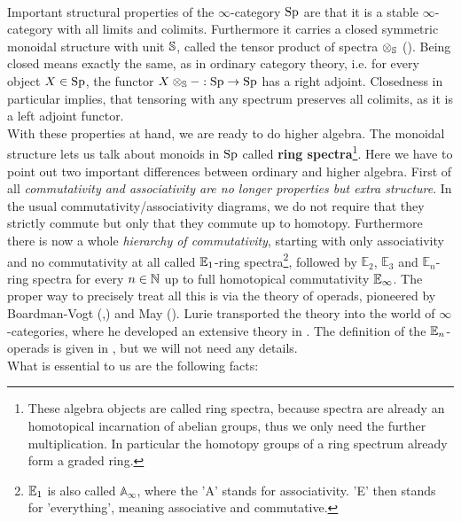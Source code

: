 \\
Important structural properties of the $\infty$-category $\Sp$ are that it is a stable $\infty$-category with all limits and colimits. 
Furthermore it carries a closed symmetric monoidal structure with unit $\S$, called the tensor product of spectra $\otimes_\S$ (\cite[Corollary~4.8.2.19]{lurie2017higher}).
Being closed means exactly the same, as in ordinary category theory, i.e. for every object $X\in \Sp$, the functor $X\otimes_\S-:\Sp\to \Sp $ has a right adjoint. 
Closedness in particular implies, that tensoring with any spectrum preserves all colimits, as it is a left adjoint functor. \\
With these properties at hand, we are ready to do higher algebra.
The monoidal structure lets us talk about monoids in $\Sp$ called \textbf{ring spectra}\footnote{These algebra objects are called ring spectra, because spectra are already an homotopical incarnation of abelian groups, thus we only need the further multiplication. In particular the homotopy groups of a ring spectrum already form a graded ring.}.
Here we have to point out two important differences between ordinary and higher algebra. 
First of all \textit{commutativity and associativity are no longer  properties but extra structure}. In the usual commutativity/associativity diagrams, we do not require that they strictly commute but only that they commute up to homotopy. 
Furthermore there is now a whole \textit{hierarchy of commutativity}, starting with only associativity and no commutativity at all called $\Eone$-ring spectra\footnote{$\Eone$ is also called $\mathbb{A}_\infty$, where the 'A' stands for associativity. 'E' then stands for 'everything', meaning associative and commutative.}, followed by $\mathbb{E}_2$, $\mathbb{E}_3$ and $\mathbb{E}_n$-ring spectra for every $n\in \N$ up to full homotopical commutativity $\Einf$. 
The proper way to precisely treat all this is via the theory of operads, pioneered by Boardman-Vogt (\cite{BV2006homotopyalgstructures},\cite{BV1968homotopyHspaces}) and May (\cite{may2006geometryloop}).
Lurie transported the theory into the world of $\infty$-categories, where he developed an extensive theory in \cite[Chapter~2,3,4]{lurie2017higher}. The definition of the $\En$-operads is given in \cite[Definition~5.1.0.2]{lurie2017higher}, but we will not need any details. \\
What is essential to us are the following facts:

